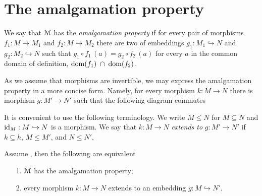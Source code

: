 \documentclass[creche.tex]{subfiles}
\begin{document}
\section{The amalgamation property}

We say that $\EuScript M$ has the \emph{amalgamation property\/} if for every pair of morphisms $f_1:M\to M_1$ and $f_2:M\to M_2$ there are two of embeddings $g_1:M_1\hookrightarrow N$ and $g_2:M_2\hookrightarrow N$ such that $g_1\circ f_1\, (a) = g_2\circ f_2\, (a)$ for every $a$ in the common domain of definition, $\mathop{\rm dom} (f_1)\; \cap\; \mathop{\rm dom} (f_2)$.


\hfil{}

As we assume that morphisms are invertible, we may express the amalgamation property in a more concise form. Namely, for every morphism $k:M\to N$ there is morphism  $g:M'\to N'$ such that the following diagram commutes

\hfil{}

It is convenient to use the following terminology. We write \emph{$M\le N$\/} for $M\subseteq N$ and $\textrm{id}_M:M\hookrightarrow N$ is a morphism. We say that $k:M\to N$ \emph{extends to\/} $g:M'\to N'$ if $k\subseteq h$, $M\le M'$, and  $N\le N'$.


\begin{proposition}\label{prop_amalgamation_def}
Assume , then the following are equivalent
\begin{itemize}
\item[1.] $\EuScript M$ has the amalgamation property;
\item[2.] every morphism $k:M\to N$ extends to an embedding $g : M\hookrightarrow N'$.
\end{itemize}
\end{proposition}
\end{document}
